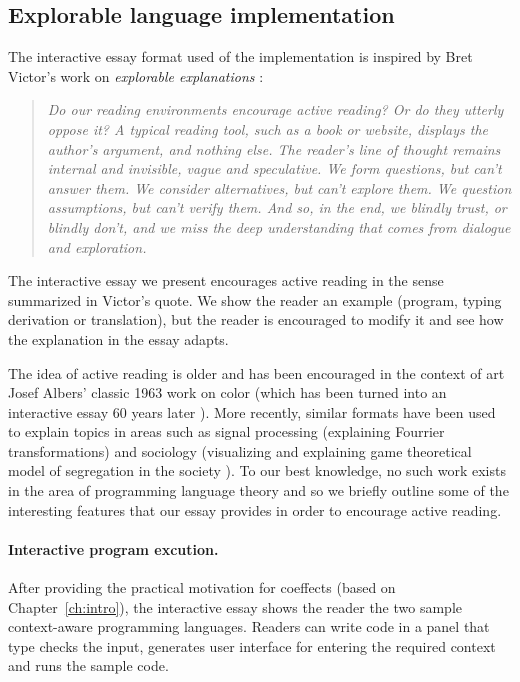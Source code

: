 \subsection{Explorable language implementation}
\label{sec:impl-essay-features}

The interactive essay format used of the implementation is inspired by Bret Victor's work on
\emph{explorable explanations} \cite{essay-explorable}:
%
\begin{quote}
\emph{Do our reading environments encourage active reading? Or do they utterly oppose it? A
  typical reading tool, such as a book or website, displays the author's argument, and nothing
  else. The reader's line of thought remains internal and invisible, vague and speculative. We
  form questions, but can't answer them. We consider alternatives, but can't explore them. We
  question assumptions, but can't verify them. And so, in the end, we blindly trust, or blindly
  don't, and we miss the deep understanding that comes from dialogue and exploration.}
\end{quote}
%
The interactive essay we present encourages active reading in the sense summarized in Victor's quote.
We show the reader an example (program, typing derivation or translation), but the reader is
encouraged to modify it and see how the explanation in the essay adapts.

The idea of active reading is older and has been encouraged in the context of art Josef Albers'
classic 1963 work on color \cite{essay-albers} (which has been turned into an interactive essay
60 years later \cite{essay-albers-app}). More recently, similar formats have been used to explain
topics in areas such as signal processing \cite{essay-seeing} (explaining Fourrier transformations)
and sociology \cite{essay-polygons} (visualizing and explaining game theoretical model of segregation
in the society \cite{essay-segregation}). To our best knowledge, no such work exists in the area
of programming language theory and so we briefly outline some of the interesting features that
our essay provides in order to encourage active reading.

\paragraph{Interactive program excution.}

After providing the practical motivation for coeffects (based on Chapter~\ref{ch:intro}), the
interactive essay shows the reader the two sample context-aware programming languages. Readers can
write code in a panel that type checks the input, generates user interface for entering the
required context and runs the sample code.

